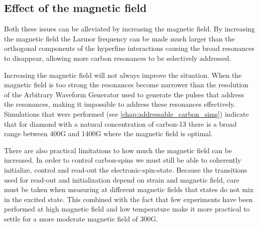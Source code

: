 \subsection*{Effect of the magnetic field}
Both these issues can be alleviated by increasing the magnetic field.
By increasing the magnetic field the Larmor frequency can be made much larger than the orthogonal components of the hyperfine interactions causing the broad resonances to disappear, allowing more carbon resonances to be selectively addressed.

Increasing the magnetic field will not always improve the situation. When the magnetic field is too strong the resonances become narrower than the resolution of the Arbitrary Waveform Generator used to generate the pulses that address the resonances, making it impossible to address these resonances effectively.
Simulations that were performed (see \cref{chap:addressable_carbon_sims}) indicate that for diamond with a natural concentration of carbon-13 there is a broad range between 400G and 1400G where the magnetic field is optimal.

There are also practical limitations to how much the magnetic field can be increased. In order to control carbon-spins we must still be able to coherently initialize, control and read-out the electronic-spin-state. Because the transitions used for read-out and initialization depend on strain and magnetic field\citep{Hensen2011MeasurementBased}, care must be taken when measuring at different magnetic fields that states do not mix in the excited state.
This combined with the fact that few experiments have been performed at high magnetic field and low temperature make it more practical to settle for a more moderate magnetic field of 300G.


